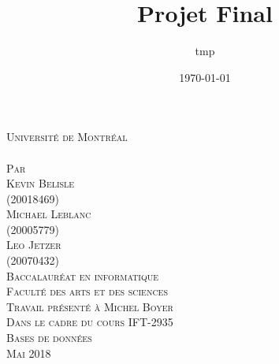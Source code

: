 \documentclass[a4paper,12pt]{article}
\date{\today}
\title{Projet Final}
\author{tmp}
\newcommand{\Author}{Kevin Belisle}
\newcommand{\Authorr}{Michael Leblanc}
\newcommand{\Authorrr}{Leo Jetzer}
\newcommand{\Teacher}{Michel Boyer}
\newcommand{\ClassNum}{IFT-2935}
\newcommand{\ClassName}{Bases de données}
\newcommand{\DateMMMMYYYY}{Mai 2018}
\begin{document}
	\begin{titlepage} 
		\begin{center}
			\textsc{\normalsize Université de Montréal}\\[2.25cm]
			 
			\textsc{\LARGE \@title}\\[2.25cm]
			
			\textsc{\small Par}\\[0.25cm]
			\textsc{\LARGE \Author}\\[0.25cm]
			\textsc{\normalsize (20018469)}\\[0.25cm]
			\textsc{\LARGE \Authorr}\\[0.25cm]
			\textsc{\normalsize (20005779)}\\[0.25cm]
			\textsc{\LARGE \Authorrr}\\[0.25cm]
			\textsc{\normalsize (20070432)}\\[2cm]
			
			\textsc{\normalsize Baccalauréat en informatique}\\
			\textsc{\normalsize Faculté des arts et des sciences}\\[2.25cm]
			
			\textsc{\small Travail présenté à \Teacher}\\
			\textsc{\small Dans le cadre du cours \ClassNum}\\
			\textsc{\small \ClassName}\\[2.25cm]
			
			\textsc{\normalsize \DateMMMMYYYY}\\[1.5cm]
		\end{center}
	\end{titlepage}
\end{document}
